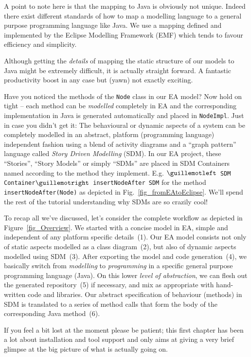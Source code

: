 A point to note here is that the mapping to Java is obviously not unique. 
Indeed there exist different standards of how to map a modelling language to a general purpose programming language like Java. 
We use a mapping defined and implemented by the Eclipse Modelling Framework (EMF) which tends to favour efficiency and simplicity.

Although getting the \emph{details} of mapping the static structure of our models to Java might be extremely difficult, it is actually straight forward.  
A fantastic productivity boost in any case but (yawn) not exactly exciting.

Have you noticed the methods of the \texttt{Node} class in our EA model? 
Now hold on tight -- each method can be \emph{modelled} completely in EA and the corresponding implementation in Java is generated automatically and placed in \texttt{NodeImpl}.  
Just in case you didn't get it: The behavioural or dynamic aspects of a system can be completely modelled in an abstract, platform (programming language) independent fashion using a blend of activity  diagrams and a ``graph pattern'' language called \textit{Story Driven Modelling} (SDM).  
In our EA project, these ``Stories'', ``Story Models'' or simply ``SDMs'' are  placed in SDM Containers named according to the method they implement.  
E.g.  \texttt{$\guillemotleft$ SDM Container$\guillemotright$ insertNodeAfter SDM} for the method  \texttt{insertNodeAfter(Node)} as depicted in
Fig.~\ref{fig_fromEAtoEclipse}.  
We'll spend the rest of the tutorial understanding why SDMs are so  {\huge crazily} cool!
 
To recap all we've discussed, let's consider the complete workflow as depicted in Figure~\ref{fig_Overview}. 
We started with a concise model in EA, simple and independent of any platform specific details~(1).  
Our EA model consists not only of static aspects modelled as a class diagram~(2), but also of dynamic
aspects modelled using SDM~(3).  After exporting the model and code generation~(4), we basically switch from \emph{modelling} to \emph{programming} in a specific general purpose programming language (Java).  
On this lower \emph{level of abstraction}, we can flesh out the generated repository~(5) if necessary, and mix as appropriate with hand-written code and libraries.  Our abstract specification of behaviour (methods) in SDM is translated to a series of method calls that form the body of the corresponding Java method~(6).

If you feel a bit lost at the moment please be patient; this first chapter has been a lot about installation and tool support and only aims at giving a very brief glimpse at the big picture of what is actually going on.    

